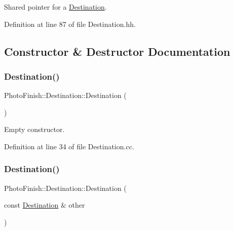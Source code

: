 Shared pointer for a \hyperlink{class_photo_finish_1_1_destination}{Destination}. 



Definition at line 87 of file Destination.\+hh.



\subsection{Constructor \& Destructor Documentation}
\mbox{\label{class_photo_finish_1_1_destination_ada09c94b6f5f555bb3163bf1d28f0d69}} 
\subsubsection{\texorpdfstring{Destination()}{Destination()}\hspace{0.1cm}{\footnotesize\ttfamily [1/2]}}
{\footnotesize\ttfamily Photo\+Finish\+::\+Destination\+::\+Destination (\begin{DoxyParamCaption}{ }\end{DoxyParamCaption})}



Empty constructor. 



Definition at line 34 of file Destination.\+cc.

\mbox{\label{class_photo_finish_1_1_destination_acfa92e5c9d061871a842371fb04e5a3e}} 
\subsubsection{\texorpdfstring{Destination()}{Destination()}\hspace{0.1cm}{\footnotesize\ttfamily [2/2]}}
{\footnotesize\ttfamily Photo\+Finish\+::\+Destination\+::\+Destination (\begin{DoxyParamCaption}\item[{const \hyperlink{class_photo_finish_1_1_destination}{Destination} \&}]{other }\end{DoxyParamCaption})}



